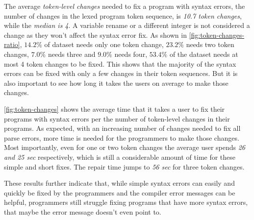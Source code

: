 The average \emph{token-level changes} needed to fix a program with syntax
errors, \ie the number of changes in the lexed program token sequence, is
\emph{10.7 token changes}, while the \emph{median is 4}. A variable rename or a
different integer is not considered a change as they won't affect the syntax
error fix. As shown in \autoref{fig:token-changes-ratio}, $14.2\%$ of dataset
needs only one token change, $23.2\%$ needs two token changes, $7.0\%$ needs
three and $9.0\%$ needs four, \ie $53.4\%$ of the dataset needs at most 4 token
changes to be fixed. This shows that the majority of the syntax errors can be
fixed with only a few changes in their token sequences. But it is also important
to see how long it takes the users on average to make those changes.

\autoref{fig:token-changes} shows the average time that it takes a user to fix
their programs with syntax errors per the number of token-level changes in their
programs. As expected, with an increasing number of changes needed to fix all
parse errors, more time is needed for the programmers to make those changes.
Most importantly, even for one or two token changes the average user spends
\emph{26 and 25 sec} respectively, which is still a considerable amount of time
for these simple and short fixes. The repair time jumps to \emph{56 sec} for
three token changes.

These results further indicate that, while simple syntax errors can easily and
quickly be fixed by the programmers and the compiler error messages can be
helpful, programmers still struggle fixing programs that have more syntax
errors, that maybe the error message doesn't even point to.
